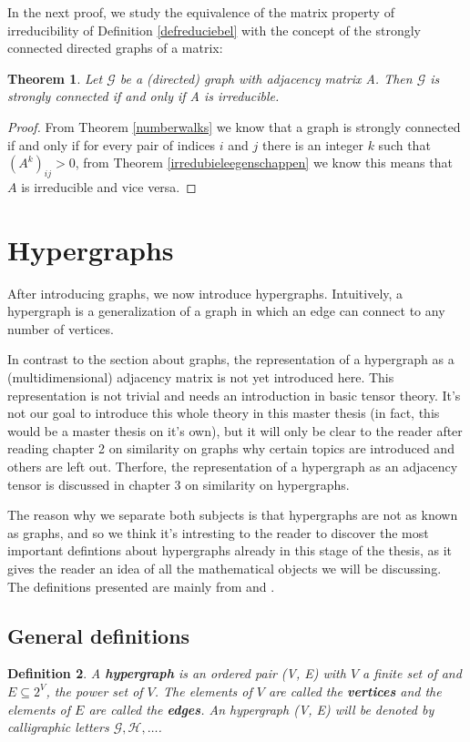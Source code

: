 \documentclass[a4paper,11pt]{report}
\newtheorem{theorem}{Theorem}[section]
\newtheorem{definition}[theorem]{Definition}
\newcommand{\graf}{\mathscr{G}}
\begin{document}
In the next proof, we study the equivalence of the matrix property of 
irreducibility of  Definition \ref{defreduciebel} with the concept of the 
strongly connected directed graphs of a matrix:
\begin{theorem}
    Let $\graf$ be a (directed) graph with adjacency matrix A. Then $\graf$ is strongly connected if and only if A is irreducible.

\end{theorem}

\begin{proof}
From Theorem \ref{numberwalks} we know that a graph is strongly connected if and only if for every pair of indices $i$ and $j$ 
there is an integer $k$ such that $(A^k)_{ij} > 0$, from Theorem \ref{irredubieleegenschappen} we 
know this means that $A$ is irreducible and vice versa.

\end{proof}

\section{Hypergraphs}
After introducing graphs, we now introduce hypergraphs. Intuitively, a 
hypergraph is a generalization of a graph in which an edge can connect to any 
number of vertices. 

In contrast to the section about graphs, the representation of a hypergraph as a (multidimensional) adjacency matrix 
is not yet introduced here. This representation is not trivial and needs an 
introduction in basic tensor theory. It's not our goal to introduce this whole theory in this master thesis (in fact, this would
be a master thesis on it's own), but it will only be clear to the reader after reading chapter 
2 on similarity on graphs why certain topics are introduced and others are 
left out. Therfore, the representation of a hypergraph as an adjacency tensor is 
discussed in chapter 3 on similarity on hypergraphs.

The reason why we separate both subjects is that hypergraphs are not as known as graphs, and so we think it's 
intresting to the reader to discover the most important defintions about 
hypergraphs already in this stage of the thesis, as it gives the reader an idea of all the mathematical objects we 
will be discussing. The definitions presented are mainly from \cite{berge} and 
\cite{hypper}.

\subsection{General definitions}
\begin{definition}\label{defhypergraph}
  A \textbf{hypergraph} is an ordered pair (V, E) with $V$ a finite set of 
and $E \subseteq 2^V$, the power set of $V$. The elements of $V$ are called
the \textbf{vertices} and the elements of $E$ are called the \textbf{edges}.
An hypergraph (V, E) will be denoted by calligraphic letters $\mathcal{G}, \mathcal{H},\ldots$.  
  \end{definition}
\end{document}

